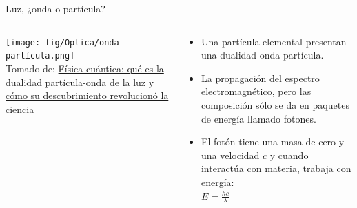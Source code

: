 \documentclass[aspectratio=169]{beamer}
\begin{document}
\begin{frame}{Luz, ¿onda o partícula?}
\begin{columns}[c, onlytextwidth]
        \begin{column}{0.45\textwidth}
            \centering
            \texttt{[image: fig/Optica/onda-partícula.png]}\\
             \tiny{Tomado de: \href{https://www.bbc.com/mundo/noticias-52815076}{Física cuántica: qué es la dualidad partícula-onda de la luz y cómo su descubrimiento revolucionó la ciencia}}
        \end{column}
        \begin{column}{0.55\textwidth}
            \begin{itemize}
                \item Una partícula elemental presentan una dualidad onda-partícula. 
                \item  La propagación del espectro electromagnético, pero las composición sólo se da en paquetes de energía llamado fotones.
                \item El fotón tiene una masa de cero y una velocidad $c$ y cuando interactúa con materia, trabaja con energía: \\
                \centering
                $E=\frac{hc}{\lambda}$
            \end{itemize}
        \end{column}
    \end{columns}
\end{frame}
\end{document}
